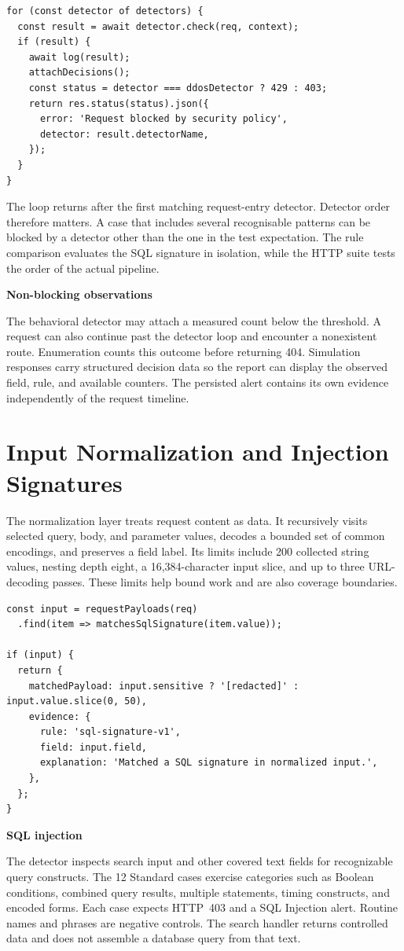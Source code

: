 \documentclass[11pt,letterpaper,oneside]{report}
\newcommand{\topic}[1]{\smallskip\noindent\textbf{#1}\par\nobreak\vspace{-.39em}}
\newcommand{\sheet}[1]{\clearpage\section{#1}}
\begin{document}
\begin{lstlisting}[caption={Adapted detector dispatch from server/middleware.ts}]
for (const detector of detectors) {
  const result = await detector.check(req, context);
  if (result) {
    await log(result);
    attachDecisions();
    const status = detector === ddosDetector ? 429 : 403;
    return res.status(status).json({
      error: 'Request blocked by security policy',
      detector: result.detectorName,
    });
  }
}
\end{lstlisting}

The loop returns after the first matching request-entry detector. Detector order therefore matters. A case that includes several recognisable patterns can be blocked by a detector other than the one in the test expectation. The rule comparison evaluates the SQL signature in isolation, while the HTTP suite tests the order of the actual pipeline.

\topic{Non-blocking observations}
The behavioral detector may attach a measured count below the threshold. A request can also continue past the detector loop and encounter a nonexistent route. Enumeration counts this outcome before returning 404. Simulation responses carry structured decision data so the report can display the observed field, rule, and available counters. The persisted alert contains its own evidence independently of the request timeline.

\sheet{Input Normalization and Injection Signatures}
The normalization layer treats request content as data. It recursively visits selected query, body, and parameter values, decodes a bounded set of common encodings, and preserves a field label. Its limits include 200 collected string values, nesting depth eight, a 16,384-character input slice, and up to three URL-decoding passes. These limits help bound work and are also coverage boundaries.

\begin{lstlisting}[caption={Adapted evidence construction from server/detectors/sqli.ts}]
const input = requestPayloads(req)
  .find(item => matchesSqlSignature(item.value));

if (input) {
  return {
    matchedPayload: input.sensitive ? '[redacted]' : input.value.slice(0, 50),
    evidence: {
      rule: 'sql-signature-v1',
      field: input.field,
      explanation: 'Matched a SQL signature in normalized input.',
    },
  };
}
\end{lstlisting}

\topic{SQL injection}
The detector inspects search input and other covered text fields for recognizable query constructs. The 12 Standard cases exercise categories such as Boolean conditions, combined query results, multiple statements, timing constructs, and encoded forms. Each case expects HTTP~403 and a SQL Injection alert. Routine names and phrases are negative controls. The search handler returns controlled data and does not assemble a database query from that text.
\end{document}
